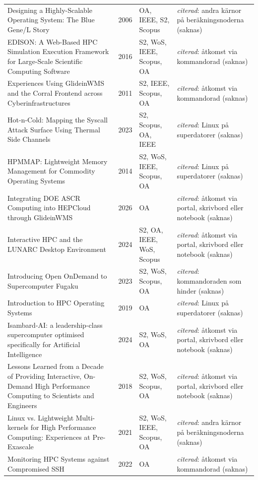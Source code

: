 \begin{longtable}{@{}%
  >{\raggedright\arraybackslash}p{}c%
  >{\raggedright\arraybackslash}p{}%
  >{\raggedright\arraybackslash}p{}@{}}
Designing a Highly-Scalable Operating System: The Blue Gene/L Story & 2006 & OA, IEEE, S2, Scopus & \emph{citerad}: andra kärnor på beräkningsnoderna (saknas) \\
EDISON: A Web-Based HPC Simulation Execution Framework for Large-Scale Scientific Computing Software & 2016 & S2, WoS, IEEE, Scopus, OA & \emph{citerad}: åtkomst via kommandorad (saknas) \\
Experiences Using GlideinWMS and the Corral Frontend across Cyberinfrastructures & 2011 & S2, IEEE, Scopus, OA & \emph{citerad}: åtkomst via kommandorad (saknas) \\
Hot-n-Cold: Mapping the Syscall Attack Surface Using Thermal Side Channels & 2023 & S2, Scopus, OA, IEEE & \emph{citerad}: Linux på superdatorer (saknas) \\
HPMMAP: Lightweight Memory Management for Commodity Operating Systems & 2014 & S2, WoS, IEEE, Scopus, OA & \emph{citerad}: Linux på superdatorer (saknas) \\
Integrating DOE ASCR Computing into HEPCloud through GlideinWMS & 2026 & OA & \emph{citerad}: åtkomst via portal, skrivbord eller notebook (saknas) \\
Interactive HPC and the LUNARC Desktop Environment & 2024 & S2, OA, IEEE, WoS, Scopus & \emph{citerad}: åtkomst via portal, skrivbord eller notebook (saknas) \\
Introducing Open OnDemand to Supercomputer Fugaku & 2023 & S2, WoS, Scopus, OA & \emph{citerad}: kommandoraden som hinder (saknas) \\
Introduction to HPC Operating Systems & 2019 & OA & \emph{citerad}: Linux på superdatorer (saknas) \\
Isambard-AI: a leadership-class supercomputer optimised specifically for Artificial Intelligence & 2024 & S2, WoS, OA & \emph{citerad}: åtkomst via portal, skrivbord eller notebook (saknas) \\
Lessons Learned from a Decade of Providing Interactive, On-Demand High Performance Computing to Scientists and Engineers & 2018 & S2, WoS, Scopus, OA & \emph{citerad}: åtkomst via portal, skrivbord eller notebook (saknas) \\
Linux vs. Lightweight Multi-kernels for High Performance Computing: Experiences at Pre-Exascale & 2021 & S2, WoS, IEEE, Scopus, OA & \emph{citerad}: andra kärnor på beräkningsnoderna (saknas) \\
Monitoring HPC Systems against Compromised SSH & 2022 & OA & \emph{citerad}: åtkomst via kommandorad (saknas) \\

\end{longtable}
